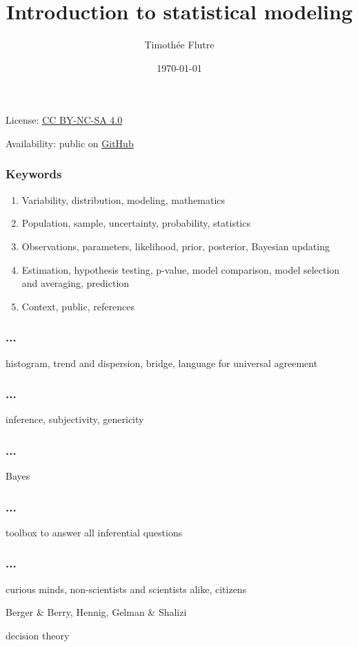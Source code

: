 \documentclass[c]{beamer} %
\title[Intro statistical modeling]{Introduction to statistical modeling}
\author[T. Flutre]{Timoth\'{e}e Flutre}
\institute[INRA]{Institut National de la Recherche Agronomique, France}
\date{\today}
\begin{document}
\begin{frame}
  \titlepage
  
  \small
  \begin{center}
    License: \href{http://creativecommons.org/licenses/by-nc-sa/4.0/}{CC BY-NC-SA 4.0}
    
    Availability: public on \href{https://github.com/timflutre/ncs}{GitHub}
  \end{center}
\end{frame}                                                                                                                       

\begin{frame}
  \frametitle{Keywords}
  \begin{enumerate}
  \item Variability, distribution, modeling, mathematics
    \bigskip
  \item Population, sample, uncertainty, probability, statistics
    \bigskip
  \item Observations, parameters, likelihood, prior, posterior, Bayesian updating
    \bigskip
  \item Estimation, hypothesis testing, p-value, model comparison, model selection and averaging, prediction
    \bigskip
  \item Context, public, references
  \end{enumerate}
\end{frame}

\begin{frame}
  \frametitle{...}
  histogram, trend and dispersion, bridge, language for universal agreement
\end{frame}

\begin{frame}
  \frametitle{...}
  inference, subjectivity, genericity
\end{frame}

\begin{frame}
  \frametitle{...}
  Bayes
\end{frame}

\begin{frame}
  \frametitle{...}
  toolbox to answer all inferential questions
\end{frame}

\begin{frame}
  \frametitle{...}
  curious minds, non-scientists and scientists alike, citizens
  
  Berger \& Berry, Hennig, Gelman \& Shalizi
  
  decision theory
\end{frame}
\end{document}
